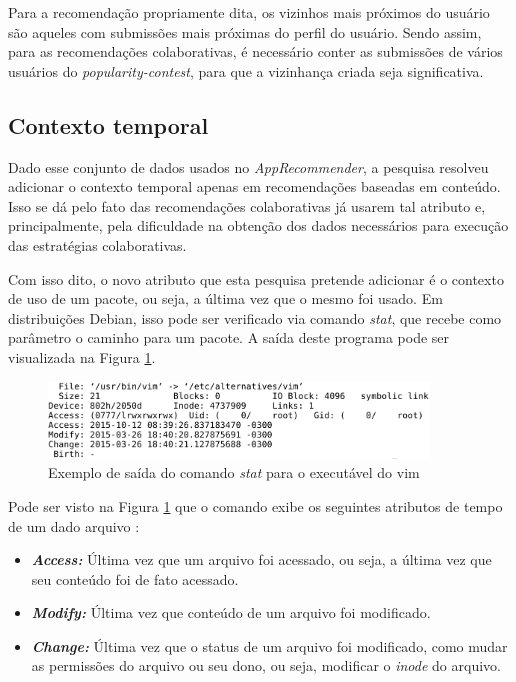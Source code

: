 Para a recomendação propriamente dita, os vizinhos mais próximos do usuário são
aqueles com submissões mais próximas do perfil do usuário. Sendo assim, para as
recomendações colaborativas, é necessário conter as submissões de vários
usuários do \textit{popularity-contest}, para que a vizinhança criada seja significativa.

\subsection{Contexto temporal} \label{sec:contexto_temporal}

Dado esse conjunto de dados usados no \textit{AppRecommender}, a pesquisa resolveu
adicionar o contexto temporal apenas em recomendações baseadas em conteúdo. Isso
se dá pelo fato das recomendações colaborativas já usarem tal atributo e,
principalmente, pela dificuldade na obtenção dos dados necessários para execução
das estratégias colaborativas.

Com isso dito, o novo atributo que esta pesquisa pretende
adicionar é o contexto de uso de um pacote, ou seja, a última vez que o
mesmo foi usado. Em distribuições Debian, isso pode ser verificado via comando
\textit{stat}, que recebe como parâmetro o caminho para um pacote.
A saída deste programa pode ser visualizada na Figura \ref{fig:comando_stat}.

\begin{figure}[h]
  \centering
  \includegraphics[width=0.9\textwidth]{figuras/comando_stat.eps}
  \caption{Exemplo de saída do comando \textit{stat} para o executável do vim}
  \label{fig:comando_stat}
\end{figure}

Pode ser visto na Figura \ref{fig:comando_stat} que o comando exibe os seguintes
atributos de tempo de um dado arquivo \cite{1_haas}:

\begin{itemize}
    \item \textit{\textbf{Access:}} Última vez que um arquivo foi acessado, ou seja, a
        última vez que seu conteúdo foi de fato acessado.
    \item \textit{\textbf{Modify:}} Última vez que conteúdo de um arquivo foi modificado.
    \item \textit{\textbf{Change:}} Última vez que o status de um arquivo foi modificado,
        como mudar as permissões do arquivo ou seu dono, ou seja, modificar o
        \textit{inode} do arquivo.
\end{itemize}

